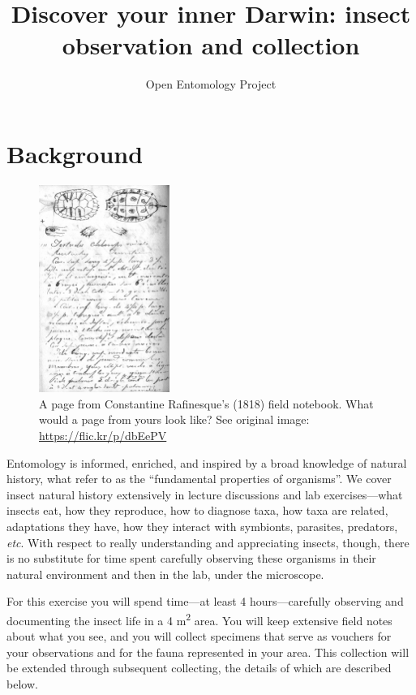 \documentclass[letterpaper, 11pt]{article}
\title{Discover your inner Darwin: insect observation and collection}
\author{Open Entomology Project}
\begin{document}
\cleanlookdateon %
\maketitle
\thispagestyle{fancy}

\section*{Background}
\begin{figure}
  \vspace{-20pt}
  \begin{center}
    \includegraphics[width=0.38\textwidth]{Rafinesque}
  \end{center}
  \vspace{-16pt}
  \caption{A page from Constantine Rafinesque's (1818) field notebook. What would a page from yours look like? See original image: \url{https://flic.kr/p/dbEePV}}
  \vspace{-38pt}
\end{figure}
Entomology is informed, enriched, and inspired by a broad knowledge of natural history, what \cite{Tewksbury01042014} refer to as the ``fundamental properties of organisms''. We cover insect natural history extensively in lecture discussions and lab exercises---what insects eat, how they reproduce, how to diagnose taxa, how taxa are related, adaptations they have, how they interact with symbionts, parasites, predators, \textit{etc}. With respect to really understanding and appreciating insects, though, there is no substitute for time spent carefully observing these organisms in their natural environment and then in the lab, under the microscope. 

For this exercise you will spend time---at least 4 hours---carefully observing and documenting the insect life in a 4 m\textsuperscript{2} area. You will keep extensive field notes about what you see, and you will collect specimens that serve as vouchers for your observations and for the fauna represented in your area. This collection will be extended through subsequent collecting, the details of which are described below.
\end{document}
